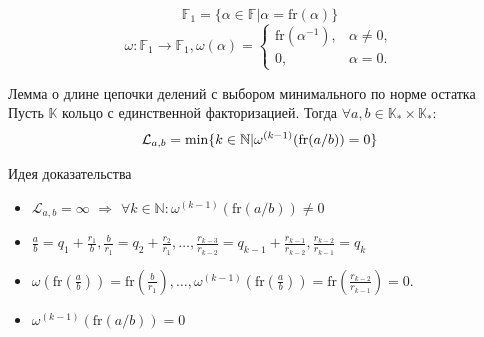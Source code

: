 \documentclass[8pt, xcolor=x11names]{beamer}
\begin{document}
\begin{frame}
    \begin{block_notitle}{}
        $$
            \mathbb{F}_{1}=\{\alpha\in\mathbb{F}|\alpha=\textrm{fr}(\alpha)\}
        $$
        $$
            \omega:\mathbb{F}_{1}\to\mathbb{F}_{1}, \omega(\alpha)=
            \begin{cases}
                \textrm{fr}(\alpha^{-1}), & \alpha\neq0,\\
                0, & \alpha = 0.
            \end{cases}
        $$
    \end{block_notitle}
    
    \begin{block}{Лемма о длине цепочки делений с выбором минимального по норме остатка}
        Пусть $\mathbb{K}$ кольцо с единственной факторизацией.
        Тогда $\forall a, b \in \mathbb{K}_{*}\times\mathbb{K}_{*}$:
        \begin{eqnarray*}
            \mathcal{L}_{a,b}=\textnormal{min}\{k\in\mathbb{N}|\omega^{(k-1)}(\textrm{fr}(a/b))=0\}
        \end{eqnarray*}
    \end{block}
    
    \begin{block}{Идея доказательства}
        \begin{itemize}
            \item $\mathcal{L}_{a,b} = \infty$ $\Rightarrow$ $\forall k \in \mathbb{N}: \omega^{(k-1)}(\textrm{fr}(a/b)) \neq 0$
            
            \item $\frac{a}{b}=q_{1}+\frac{r_{1}}{b}, \frac{b}{r_{1}}=q_{2}+\frac{r_{2}}{r_{1}}, \ldots, \frac{r_{k-3}}{r_{k-2}}=q_{k-1}+\frac{r_{k-1}}{r_{k-2}}, \frac{r_{k-2}}{r_{k-1}}=q_{k}$
            
            \item
            $
                \omega\left(\textrm{fr}\left(\frac{a}{b}\right)\right)=\textrm{fr}\left(\frac{b}{r_{1}}\right),
                \ldots,
                \omega^{(k-1)}\left(\textrm{fr}\left(\frac{a}{b}\right)\right)=\textrm{fr}\left(\frac{r_{k-2}}{r_{k-1}}\right)=0.
            $
            
            \item $\omega^{(k-1)}(\textrm{fr}(a/b))=0$
        \end{itemize}
    \end{block}
\end{frame}
\end{document}
